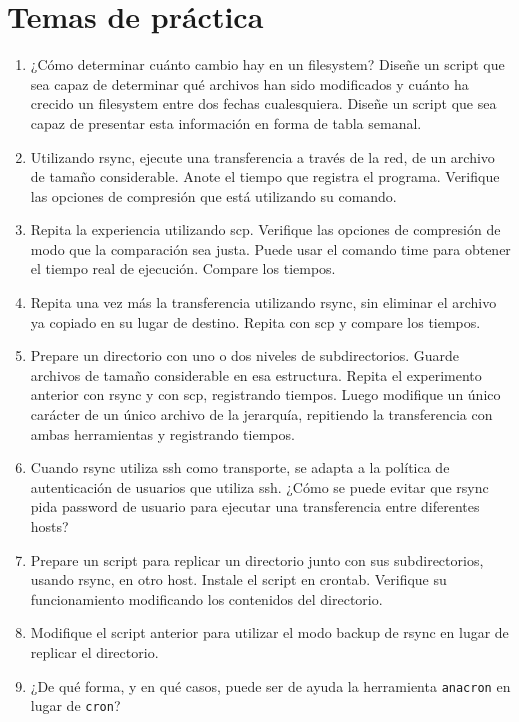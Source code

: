 \section{Temas de práctica}
\begin{enumerate}
	\item ¿Cómo determinar cuánto cambio hay en un filesystem? Diseñe un script que sea capaz de determinar qué archivos han sido modificados y cuánto ha crecido un filesystem entre dos fechas cualesquiera. Diseñe un script que sea capaz de presentar esta información en forma de tabla semanal. 
	\item Utilizando rsync, ejecute una transferencia a través de la red, de un archivo de tamaño considerable. Anote el tiempo que registra el programa. Verifique las opciones de compresión que está utilizando su comando.
	\item Repita la experiencia utilizando scp. Verifique las opciones de compresión de modo que la comparación sea justa. Puede usar el comando time para obtener el tiempo real de ejecución. Compare los tiempos. 
	\item Repita una vez más la transferencia utilizando rsync, sin eliminar el archivo ya copiado en su lugar de destino. Repita con scp y compare los tiempos.
	\item Prepare un directorio con uno o dos niveles de subdirectorios. Guarde archivos de tamaño considerable en esa estructura. Repita el experimento anterior con rsync y con scp, registrando tiempos. Luego modifique un único carácter de un único archivo de la jerarquía, repitiendo la transferencia con ambas herramientas y registrando tiempos.
	\item Cuando rsync utiliza ssh como transporte, se adapta a la política de autenticación de usuarios que utiliza ssh. ¿Cómo se puede evitar que rsync pida password de usuario para ejecutar una transferencia entre diferentes hosts?
	\item Prepare un script para replicar un directorio junto con sus subdirectorios, usando rsync, en otro host. Instale el script en crontab. Verifique su funcionamiento modificando los contenidos del directorio.
	\item Modifique el script anterior para utilizar el modo backup de rsync en lugar de replicar el directorio.
	\item ¿De qué forma, y en qué casos, puede ser de ayuda la herramienta \lstinline$anacron$ en lugar de \lstinline$cron$? 
\end{enumerate}
